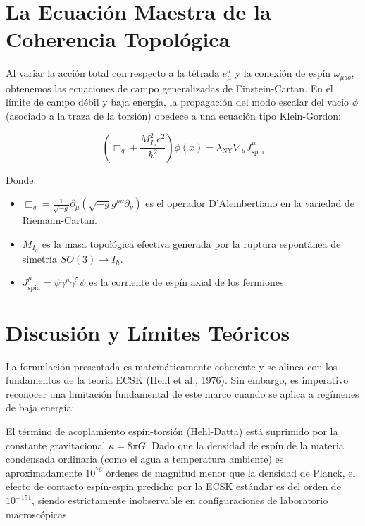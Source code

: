 \documentclass[12pt, a4paper]{article}
\begin{document}
\section{La Ecuación Maestra de la Coherencia Topológica}

Al variar la acción total con respecto a la tétrada $e^a_\mu$ y la conexión de espín $\omega_{\mu ab}$, obtenemos las ecuaciones de campo generalizadas de Einstein-Cartan. En el límite de campo débil y baja energía, la propagación del modo escalar del vacío $\phi$ (asociado a la traza de la torsión) obedece a una ecuación tipo Klein-Gordon:

\begin{equation}
    \boxed{ \left( \Box_g + \frac{M_{I_h}^2 c^2}{\hbar^2} \right) \phi(x) = \lambda_{\text{NY}} \nabla_\mu J^\mu_{\text{spin}} }
\end{equation}

Donde:
\begin{itemize}
    \item $\Box_g = \frac{1}{\sqrt{-g}}\partial_\mu(\sqrt{-g}g^{\mu\nu}\partial_\nu)$ es el operador D'Alembertiano en la variedad de Riemann-Cartan.
    \item $M_{I_h}$ es la masa topológica efectiva generada por la ruptura espontánea de simetría $SO(3) \to I_h$.
    \item $J^\mu_{\text{spin}} = \bar{\psi}\gamma^\mu\gamma^5\psi$ es la corriente de espín axial de los fermiones.
\end{itemize}

\section{Discusión y Límites Teóricos}

La formulación presentada es matemáticamente coherente y se alinea con los fundamentos de la teoría ECSK (Hehl et al., 1976). Sin embargo, es imperativo reconocer una limitación fundamental de este marco cuando se aplica a regímenes de baja energía:

El término de acoplamiento espín-torsión (Hehl-Datta) está suprimido por la constante gravitacional $\kappa = 8\pi G$. Dado que la densidad de espín de la materia condensada ordinaria (como el agua a temperatura ambiente) es aproximadamente $10^{76}$ órdenes de magnitud menor que la densidad de Planck, el efecto de contacto espín-espín predicho por la ECSK estándar es del orden de $10^{-151}$, siendo estrictamente inobservable en configuraciones de laboratorio macroscópicas.
\end{document}
